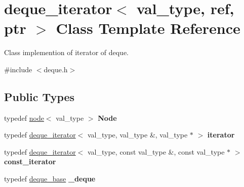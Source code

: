 \hypertarget{structdeque__iterator}{}\section{deque\+\_\+iterator$<$ val\+\_\+type, ref, ptr $>$ Class Template Reference}
\label{structdeque__iterator}


Class implemention of iterator of deque.  




{\ttfamily \#include $<$deque.\+h$>$}

\subsection*{Public Types}
\begin{DoxyCompactItemize}
\item 
\hypertarget{structdeque__iterator_a9c79caebc3c261e2bb96cff829a7f715}{}\label{structdeque__iterator_a9c79caebc3c261e2bb96cff829a7f715} 
typedef \hyperlink{structnode}{node}$<$ val\+\_\+type $>$ {\bfseries Node}
\item 
\hypertarget{structdeque__iterator_ad9cb8dfbd5ae3f72ffb26133e0b80fd5}{}\label{structdeque__iterator_ad9cb8dfbd5ae3f72ffb26133e0b80fd5} 
typedef \hyperlink{structdeque__iterator}{deque\+\_\+iterator}$<$ val\+\_\+type, val\+\_\+type \&, val\+\_\+type $\ast$ $>$ {\bfseries iterator}
\item 
\hypertarget{structdeque__iterator_a6a0273686d63d0086a4cd853de840652}{}\label{structdeque__iterator_a6a0273686d63d0086a4cd853de840652} 
typedef \hyperlink{structdeque__iterator}{deque\+\_\+iterator}$<$ val\+\_\+type, const val\+\_\+type \&, const val\+\_\+type $\ast$ $>$ {\bfseries const\+\_\+iterator}
\item 
\hypertarget{structdeque__iterator_a76ad6c943c498996efacfb39d455b2ee}{}\label{structdeque__iterator_a76ad6c943c498996efacfb39d455b2ee} 
typedef \hyperlink{classdeque__base}{deque\+\_\+base} {\bfseries \+\_\+deque}
\end{DoxyCompactItemize}
